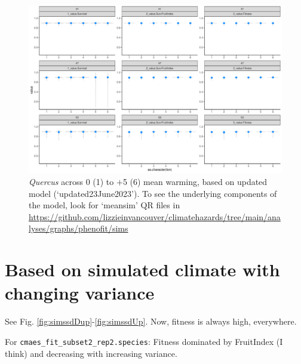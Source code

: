\documentclass[11pt,letter]{article}
\begin{document}
\begin{figure}[h!]
 \begin{center}
\noindent \includegraphics[width=1\textwidth]{..//analyses/graphs/phenofit/sims/metrics3/meansim_3metricsQR.pdf}
  \caption{\emph{Quercus} across 0 (1) to $+$5 (6) mean warming, based on updated model (`updated23June2023'). To see the underlying components of the model, look for `meansim' QR files in \url{https://github.com/lizzieinvancouver/climatehazards/tree/main/analyses/graphs/phenofit/sims}}
  \label{fig:simsmeanUp}
  \end{center}
\end{figure}


\clearall
\section*{Based on simulated climate with changing variance}

See Fig. \ref{fig:simssdDup}-\ref{fig:simssdUp}. Now, fitness is always high, everywhere. 

For \verb|cmaes_fit_subset2_rep2.species|: Fitness dominated by FruitIndex (I think) and decreasing with increasing variance.
\end{document}
